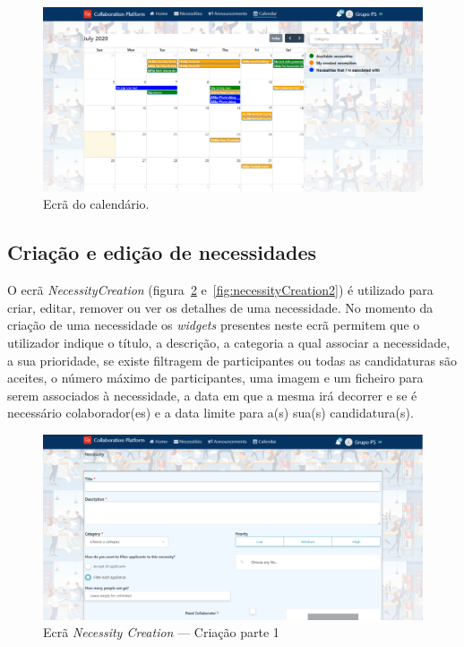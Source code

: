 \begin{figure}[H]
  \centering 
  \includegraphics[scale=0.4]{figures/Calendar.png}
  \caption{Ecrã do calendário.}\label{fig:CalendarScreen}
\end{figure}

\subsection{Criação e edição de necessidades}\label{subsec:implementacao:necessityCreation}

O ecrã \textit{NecessityCreation} (figura~\ref{fig:necessityCreation1} e~\ref{fig:necessityCreation2}) é utilizado para criar, editar, remover ou ver os detalhes de uma necessidade.
No momento da criação de uma necessidade os \textit{widgets} presentes neste ecrã permitem que o utilizador indique o título, a descrição, a categoria a qual associar a necessidade, a sua prioridade, 
se existe filtragem de participantes ou todas as candidaturas são aceites, o número máximo de participantes, uma imagem e um ficheiro para serem associados à necessidade, a data em que a mesma irá decorrer e se é necessário colaborador(es) e a data limite para a(s) sua(s) candidatura(s).

\begin{figure}[H]
  \centering 
  \includegraphics[scale=0.4]{figures/NecessityCreation1.png}
  \caption{Ecrã \textit{Necessity Creation} --- Criação parte 1}\label{fig:necessityCreation1}
\end{figure}



